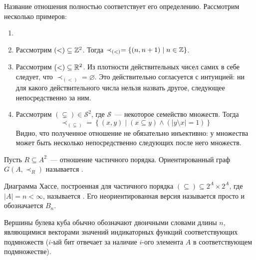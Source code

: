 Название отношения полностью соответствует его определению.
Рассмотрим несколько примеров:

\begin{example}
    \begin{enumerate}
        \item[]
        \item
            Рассмотрим $ (<) \subseteq \mathbb{Z}^2 $.
            Тогда $ \prec_{(<)} = \left\{ (n, n+1) \mid n \in \mathbb{Z} \right\} $.
        \item
            Рассмотрим $ (<) \subseteq \mathbb{R}^2 $.
            Из плотности действительных чисел самих в себе следует, что $ \prec_{(<)} = \varnothing $.
            Это действительно согласуется с интуицией: ни для какого действительного числа нельзя назвать другое,
            следующее непосредственно за ним.
        \item
            Рассмотрим $ (\subsetneq) \in \mathcal{S}^2 $, где $ \mathcal{S} $~--- некоторое семейство множеств.
            Тогда
            \[
                \prec_{(\subsetneq)} = \left\{ (x, y) \mid (x \subseteq y) \wedge (|y \setminus x| = 1) \right\}
            \]
            Видно, что полученное отношение не обязательно инъективно: у множества может быть несколько непосредственно следующих после него множеств.
    \end{enumerate}
\end{example}

\begin{definition}
    Пусть $ R \subseteq A^2 $~--- отношение частичного порядка.
    Ориентированный граф $ G(A, \prec_R) $ называется .
\end{definition}

\begin{definition}
    Диаграмма Хассе, построенная для частичного порядка $ (\subseteq) \subseteq 2^A \times 2^A $, где $ |A| = n < \infty $,
    называется .
    Его неориентированная версия называется просто  и обозначается $ B_n $.
\end{definition}

\begin{remark}
    Вершины булева куба обычно обозначают двоичными словами длины $ n $,
    являющимися векторами значений индикаторных функций соответствующих подмножеств
    ($ i $-ый бит отвечает за наличие $ i $-ого элемента $ A $ в соответствующем подмножестве).
\end{remark}

